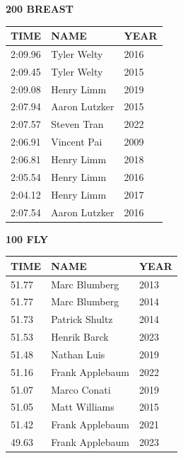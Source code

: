 \begin{table}[H]
\centering
\begin{minipage}[t]{0.48\textwidth}
\centering
\textbf{200 BREAST}\\[0.1cm]
\begin{tabular}{@{}p{1.8cm}p{2.8cm}p{1.2cm}@{}}
\hline
    \textbf{TIME} & \textbf{NAME} & \textbf{YEAR} \\
\hline
    2:09.96 & Tyler Welty & 2016 \\
    2:09.45 & Tyler Welty & 2015 \\
    2:09.08 & Henry Limm & 2019 \\
    2:07.94 & Aaron Lutzker & 2015 \\
    2:07.57 & Steven Tran & 2022 \\
    2:06.91 & Vincent Pai & 2009 \\
    2:06.81 & Henry Limm & 2018 \\
    2:05.54 & Henry Limm & 2016 \\
    2:04.12 & Henry Limm & 2017 \\
    2:07.54 & Aaron Lutzker & 2016 \\
\hline
\end{tabular}
\end{minipage}\hfill
\begin{minipage}[t]{0.48\textwidth}
\centering
\textbf{100 FLY}\\[0.1cm]
\begin{tabular}{@{}p{1.8cm}p{2.8cm}p{1.2cm}@{}}
\hline
    \textbf{TIME} & \textbf{NAME} & \textbf{YEAR} \\
\hline
    51.77 & Marc Blumberg & 2013 \\
    51.77 & Marc Blumberg & 2014 \\
    51.73 & Patrick Shultz & 2014 \\
    51.53 & Henrik Barck & 2023 \\
    51.48 & Nathan Luis & 2019 \\
    51.16 & Frank Applebaum & 2022 \\
    51.07 & Marco Conati & 2019 \\
    51.05 & Matt Williams & 2015 \\
    51.42 & Frank Applebaum & 2021 \\
    49.63 & Frank Applebaum & 2023 \\
\hline
\end{tabular}
\end{minipage}
\end{table}

